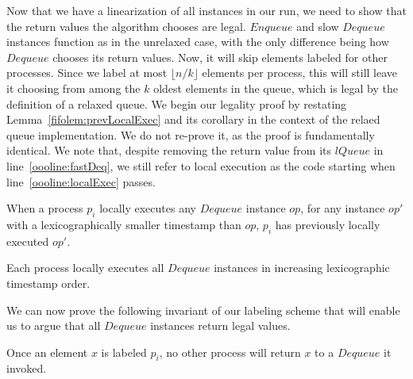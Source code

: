 \documentclass[a4paper,anonymous,USenglish]{lipics-v2021} %
\theoremstyle{definition}
\begin{document}

Now that we have a linearization of all instances in our run, we need to show that the return values the algorithm chooses are legal.  $Enqueue$ and slow $Dequeue$ instances function as in the unrelaxed case, with the only difference being how $Dequeue$ chooses its return values.  Now, it will skip elements labeled for other processes.  Since we label at most $\lfloor n/k\rfloor$ elements per process, this will still leave it choosing from among the $k$ oldest elements in the queue, which is legal by the definition of a relaxed queue.  We begin our legality proof by restating Lemma~\ref{fifolem:prevLocalExec} and its corollary in the context of the relaed queue implementation.  We do not re-prove it, as the proof is fundamentally identical.  We note that, despite removing the return value from its $lQueue$ in line~\ref{oooline:fastDeq}, we still refer to local execution as the code starting when line~\ref{oooline:localExec} passes.

\begin{lemma}
  When a process $p_i$ locally executes any $Dequeue$ instance $op$, for any instance $op'$ with a lexicographically smaller timestamp than $op$, $p_i$ has previously locally executed $op'$.
\end{lemma}

\begin{corollary}\label{ooolem:localExecOrder}
  Each process locally executes all $Dequeue$ instances in increasing lexicographic timestamp order.
\end{corollary}

We can now prove the following invariant of our labeling scheme that will enable us to argue that all $Dequeue$ instances return legal values.

\begin{lemma}\label{ooolem:labelOwner}
  Once an element $x$ is labeled $p_i$, no other process will return $x$ to a $Dequeue$ it invoked.
\end{lemma}
\end{document}
